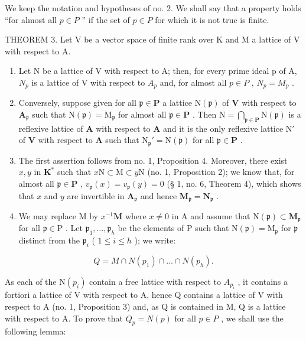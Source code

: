We keep the notation and hypotheses of no. 2. We shall say that a property holds ``for almost all \(p \in P\) '' if the set of \(p \in P\) for which it is not true is finite.

THEOREM 3. Let V be a vector space of finite rank over K and M a lattice of V with respect to A.

\begin{enumerate}
\def\labelenumi{(\roman{enumi})}
\item
  Let N be a lattice of V with respect to A; then, for every prime ideal p of A, \(N_{p}\) is a lattice of V with respect to \(A_{p}\) and, for almost all \(p \in P\) , \(N_{p} = M_{p}\) .
\item
  Conversely, suppose given for all \(\mathfrak{p} \in \mathbf{P}\) a lattice \(\mathrm{N}(\mathfrak{p})\) of \(\mathbf{V}\) with respect to \(\mathbf{A}_{\mathfrak{p}}\) such that \(\mathrm{N}(\mathfrak{p}) = \mathrm{M}_{\mathfrak{p}}\) for almost all \(\mathfrak{p} \in \mathbf{P}\) . Then \(\mathrm{N} = \bigcap_{\mathfrak{p} \in \mathbf{P}} \mathrm{N}(\mathfrak{p})\) is a reflexive lattice of \(\mathbf{A}\) with respect to \(\mathbf{A}\) and it is the only reflexive lattice \(\mathrm{N}'\) of \(\mathbf{V}\) with respect to \(\mathbf{A}\) such that \(\mathrm{N}_{\mathfrak{p}}' = \mathrm{N}(\mathfrak{p})\) for all \(\mathfrak{p} \in \mathbf{P}\) .
\item
  The first assertion follows from no. 1, Proposition 4. Moreover, there exist \(x, y\) in \(\mathbf{K}^*\) such that \(x\mathrm{N} \subset \mathrm{M} \subset y\mathrm{N}\) (no. 1, Proposition 2); we know that, for almost all \(\mathfrak{p} \in \mathbf{P}\) , \(v_{\mathfrak{p}}(x) = v_{\mathfrak{p}}(y) = 0\) (§ 1, no. 6, Theorem 4), which shows that \(x\) and \(y\) are invertible in \(\mathbf{A}_{\mathfrak{p}}\) and hence \(\mathbf{M}_{\mathfrak{p}} = \mathbf{N}_{\mathfrak{p}}\) .
\item
  We may replace M by \(x^{-1}\mathbf{M}\) where \(x \neq 0\) in A and assume that \(\mathrm{N}(\mathfrak{p}) \subset \mathbf{M}_{\mathfrak{p}}\) for all \(\mathfrak{p} \in \mathrm{P}\) . Let \(\mathfrak{p}_1, \ldots, \mathfrak{p}_h\) be the elements of P such that \(\mathrm{N}(\mathfrak{p}) = \mathrm{M}_{\mathfrak{p}}\) for \(\mathfrak{p}\) distinct from the \(\mathfrak{p}_i\) ( \(1 \leqslant i \leqslant h\) ); we write:
\end{enumerate}

\[
Q = M \cap N (p _ {1}) \cap \dots \cap N (p _ {h}).
\]

As each of the \(\mathrm{N}(p_{i})\) contain a free lattice with respect to \(A_{p_{i}}\) , it contains a fortiori a lattice of V with respect to A, hence Q contains a lattice of V with respect to A (no. 1, Proposition 3) and, as Q is contained in M, Q is a lattice with respect to A. To prove that \(Q_{p} = N(p)\) for all \(p \in P\) , we shall use the following lemma:

